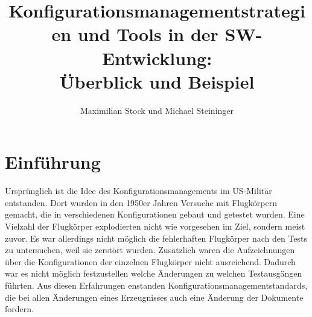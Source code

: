 \documentclass[runningheads,a4paper]{uwsese}
\begin{document}
\mainmatter

\title{Konfigurationsmanagementstrategien und Tools in der SW-Entwicklung:\\ Überblick und Beispiel}


\author{Maximilian Stock und Michael Steininger}



\maketitle




\section{Einführung}
Ursprünglich ist die Idee des Konfigurationsmanagements im US-Militär
entstanden. Dort wurden in den 1950er Jahren Versuche mit Flugkörpern gemacht,
die in verschiedenen Konfigurationen gebaut und getestet wurden. Eine
Vielzahl der Flugkörper explodierten nicht wie vorgesehen im Ziel, sondern
meist zuvor. Es war allerdings nicht möglich die fehlerhaften Flugkörper nach
den Tests zu untersuchen, weil sie zerstört wurden. Zusätzlich waren die
Aufzeichnungen über die Konfigurationen der einzelnen Flugkörper nicht
ausreichend. Dadurch war es nicht möglich festzustellen welche Änderungen zu
welchen Testausgängen führten. Aus diesen Erfahrungen enstanden
Konfigurationsmanagementstandards, die bei allen Änderungen eines Erzeugnisses
auch eine Änderung der Dokumente fordern.
\end{document}
